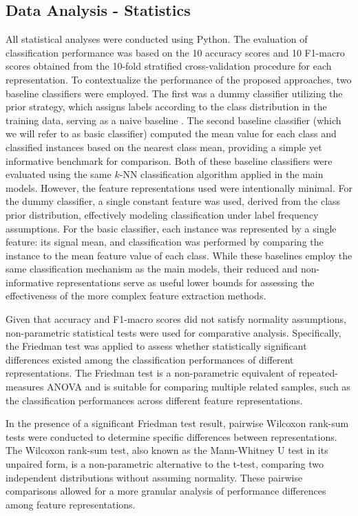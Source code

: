 \documentclass{article}
\begin{document}
\subsection{Data Analysis - Statistics}
All statistical analyses were conducted using Python. The evaluation of classification performance was based on the 10 accuracy scores and 10 F1-macro scores obtained from the 10-fold stratified cross-validation procedure for each representation. To contextualize the performance of the proposed approaches, two baseline classifiers were employed. The first was a dummy classifier utilizing the prior strategy, which assigns labels according to the class distribution in the training data, serving as a naive baseline \cite{scikit-learn}. The second baseline classifier (which we will refer to as basic classifier) computed the mean value for each class and classified instances based on the nearest class mean, providing a simple yet informative benchmark for comparison. Both of these baseline classifiers were evaluated using the same $k$-NN classification algorithm applied in the main models. However, the feature representations used were intentionally minimal. For the dummy classifier, a single constant feature was used, derived from the class prior distribution, effectively modeling classification under label frequency assumptions. For the basic classifier, each instance was represented by a single feature: its signal mean, and classification was performed by comparing the instance to the mean feature value of each class. While these baselines employ the same classification mechanism as the main models, their reduced and non-informative representations serve as useful lower bounds for assessing the effectiveness of the more complex feature extraction methods.

Given that accuracy and F1-macro scores did not satisfy normality assumptions, non-parametric statistical tests were used for comparative analysis. Specifically, the Friedman test \cite{friedman1937} was applied to assess whether statistically significant differences existed among the classification performances of different representations. The Friedman test is a non-parametric equivalent of repeated-measures ANOVA and is suitable for comparing multiple related samples, such as the classification performances across different feature representations.

In the presence of a significant Friedman test result, pairwise Wilcoxon rank-sum tests \cite{wilcoxon1992} were conducted to determine specific differences between representations. The Wilcoxon rank-sum test, also known as the Mann-Whitney U test in its unpaired form, is a non-parametric alternative to the t-test, comparing two independent distributions without assuming normality. These pairwise comparisons allowed for a more granular analysis of performance differences among feature representations.
\end{document}
